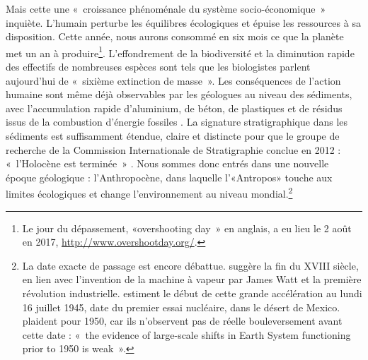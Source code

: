 Mais cette une «~croissance phénoménale du système socio-économique~» \citep{Steffen2004} inquiète. L’humain perturbe les équilibres écologiques et épuise les ressources à sa disposition. Cette année, nous aurons consommé en six mois ce que la planète met un an à produire\footnote{Le jour du dépassement,  «overshooting day~» en anglais, a eu lieu le 2 août en 2017, \url{http://www.overshootday.org/}.}. L’effondrement de la biodiversité et la diminution rapide des effectifs de nombreuses espèces sont tels que les biologistes parlent aujourd’hui de «~sixième extinction de masse~». Les conséquences de l'action humaine sont même déjà observables par les géologues au niveau des sédiments, avec l'accumulation rapide d'aluminium, de béton, de plastiques et de résidus issus de la combustion d'énergie fossiles \citep{Waters2016}. La signature stratigraphique dans les sédiments est suffisamment étendue, claire et distincte pour que le groupe de recherche de la Commission Internationale de Stratigraphie conclue en 2012 : «~l'Holocène est terminée~» \citep{Latour2014}. Nous sommes donc entrés dans une nouvelle époque géologique : l'Anthropocène, dans laquelle l'«Antropos» touche aux limites écologiques et change l'environnement au niveau mondial.\footnote{La date exacte de passage est encore débattue. \citet{Crutzen2000} suggère la fin du XVIII siècle, en lien avec l'invention de la machine à vapeur par James Watt et la première révolution industrielle. \citet{Zalasiewicz2014} estiment le début de cette grande accélération au lundi 16 juillet 1945, date du premier essai nucléaire, dans le désert de Mexico. \citet{Steffen2015}  plaident pour 1950, car ils n'observent pas de réelle bouleversement avant cette date : «~the evidence of large-scale shifts in Earth System functioning prior to 1950 is weak~».}

